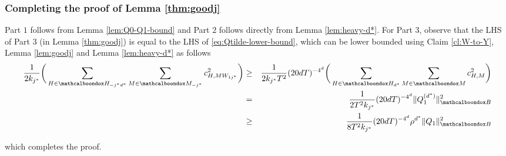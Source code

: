 \subsubsection{Completing the proof of Lemma \ref{thm:goodj}}

	Part $1$ follows from Lemma \ref{lem:Q0-Q1-bound} and Part $2$ follows directly from Lemma \ref{lem:heavy-d*}. For Part $3$, observe that the LHS of Part $3$ (in Lemma \ref{thm:goodj}) is equal to the LHS of   \eqref{eq:Qtilde-lower-bound}, which can be lower bounded using Claim \ref{cl:W-to-Y}, Lemma \ref{lem:goodj} and Lemma \ref{lem:heavy-d*} as follows
	\begin{eqnarray}
	\frac{1}{2k_{j^*}}\bigg(\sum_{H \in \mcb{H}_{-j^*d^*}}\sum_{M \in \mcb{M}_{-j^*}} c^2_{H,MW_{1j^*}}\bigg) &\ge& \frac{1}{2k_{j^*}T^2}(20dT)^{-4^d}\bigg(\sum_{H \in \mcb{H}_{d^*}}\sum_{M \in \mcb{M}} c^2_{H,M}\bigg) \\
	 &=& \frac{1}{2T^2k_{j^*}}(20dT)^{-4^d}\|Q^{(d^*)}_1\|^2_\basisA \\
	 &\ge& \frac{1}{8T^2k_{j^*}}(20dT)^{-4^d}\rho^{d^*}\|Q_1\|^2_\basisA 
	\end{eqnarray}
	
	which completes the proof.
	
	
	






